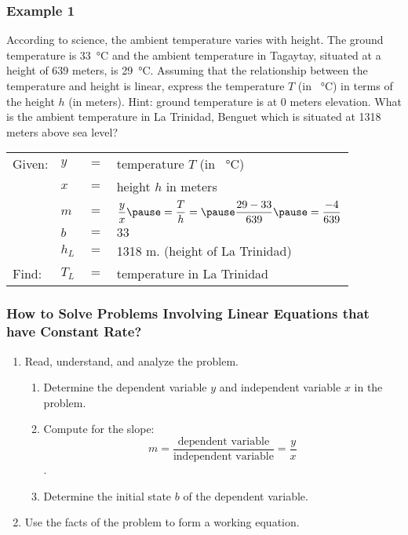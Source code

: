 \documentclass[14pt]{beamer}
\begin{document}
    \begin{frame}
    	\frametitle{Example 1}
    	\footnotesize According to science, the ambient temperature varies with height. The ground temperature is \SI{33}{\celsius} and the ambient temperature in Tagaytay, situated at a height of 639 meters, is \SI{29}{\celsius}. Assuming that the relationship between the temperature and height is linear, express the temperature $ T $ (in \SI{}{\celsius}) in terms of the height $ h $ (in meters). Hint: ground temperature is at 0 meters elevation. What is the ambient temperature in La Trinidad, Benguet which is situated at 1318 meters above sea level?
    	
    	\vone
    	\normalsize
    	\begin{tabular}{llll}
    		Given: & \pause $ y $ & $ = $ & temperature $ T $ (in \SI{}{\celsius}) \\
    		& \pause $ x $ & $ = $ & height $ h $ in meters \\
    		& \pause $ m $ & $ = $ & $ \dfrac{y}{x} \pause = \dfrac{T}{h} = \pause \dfrac{29 - 33}{639} \pause = \dfrac{-4}{639}$ \\
    		& \pause $ b $ & $ = $ & $ 33 $ \\
    		& \pause $ h_L $ & $ = $ & 1318 m. (height of La Trinidad) \\
    		\pause Find: & \pause $ T_L $ & $ = $ & temperature in La Trinidad\\
    	\end{tabular}
    \end{frame}

    \begin{frame}
    	\frametitle{How to Solve Problems Involving Linear Equations that have Constant Rate?}
    	\footnotesize
    	\begin{enumerate}  
    		\item Read, understand, and analyze the problem. 
    		\begin{enumerate}
    			\footnotesize
    			\item  Determine the dependent variable $ y $ and independent variable $ x $ in the problem.
    			\item  Compute for the slope:  \[ m = \dfrac{\text{dependent variable} }{\text{independent variable}} = \dfrac{y}{x}\] .
    			\item  Determine the initial state $ b $ of the dependent variable.
    		\end{enumerate}
    		\item  Use the facts of the problem to form a working equation.
    	\end{enumerate}  
    \end{frame}
\end{document}
